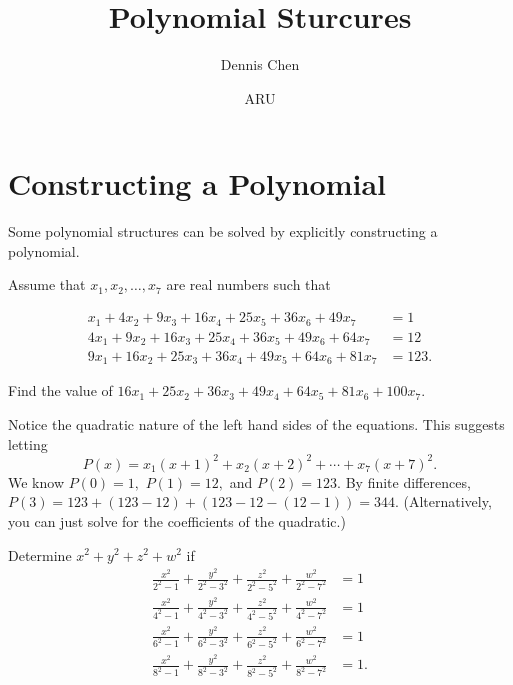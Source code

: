 \documentclass{article}
\title{Polynomial Sturcures}
\author{Dennis Chen}
\date{ARU}
\begin{document}
\maketitle

\section{Constructing a Polynomial}

Some polynomial structures can be solved by explicitly constructing a polynomial.

\begin{exam}[AIME 1989/8]
Assume that $x_1,x_2,\ldots,x_7$ are real numbers such that

\begin{align*}
x_1+4x_2+9x_3+16x_4+25x_5+36x_6+49x_7&=1\\
4x_1+9x_2+16x_3+25x_4+36x_5+49x_6+64x_7&=12\\
9x_1+16x_2+25x_3+36x_4+49x_5+64x_6+81x_7&=123.
\end{align*}

Find the value of $16x_1+25x_2+36x_3+49x_4+64x_5+81x_6+100x_7$.
\end{exam}

\begin{sol}
Notice the quadratic nature of the left hand sides of the equations. This suggests letting
\[P(x)=x_1(x+1)^2+x_2(x+2)^2+\cdots+x_7(x+7)^2.\]
We know $P(0)=1,$ $P(1)=12,$ and $P(2)=123.$ By finite differences, $P(3)=123+(123-12)+(123-12-(12-1))=344.$ (Alternatively, you can just solve for the coefficients of the quadratic.)
\end{sol}

\begin{exam}[AIME 1984/15]
Determine $x^2+y^2+z^2+w^2$ if
\begin{align*}
\frac{x^2}{2^2-1}+\frac{y^2}{2^2-3^2}+\frac{z^2}{2^2-5^2}+\frac{w^2}{2^2-7^2}&=1 \\
\frac{x^2}{4^2-1}+\frac{y^2}{4^2-3^2}+\frac{z^2}{4^2-5^2}+\frac{w^2}{4^2-7^2}&=1 \\
\frac{x^2}{6^2-1}+\frac{y^2}{6^2-3^2}+\frac{z^2}{6^2-5^2}+\frac{w^2}{6^2-7^2}&=1 \\
\frac{x^2}{8^2-1}+\frac{y^2}{8^2-3^2}+\frac{z^2}{8^2-5^2}+\frac{w^2}{8^2-7^2}&=1.
\end{align*}
\end{exam}
\end{document}
